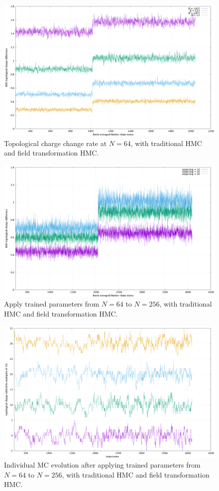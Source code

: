 \begin{figure}
	\centering
	\includegraphics[width=\textwidth]{../topodiffN64.png}
	\caption{\label{topo-diff-n64}Topological charge change rate at $N=64$,
		with traditional HMC and field transformation HMC.}
\end{figure}

\begin{figure}
	\centering
	\includegraphics[width=\textwidth]{../topodiffN256.png}
	\caption{\label{topo-diff-n256}Apply trained parameters from $N=64$ to $N=256$,
		with traditional HMC and field transformation HMC.}
\end{figure}

\begin{figure}
	\centering
	\includegraphics[width=\textwidth]{../topoevoN256.png}
	\caption{\label{topo-evo-n256}Individual MC evolution after
		applying trained parameters from $N=64$ to $N=256$,
		with traditional HMC and field transformation HMC.}
\end{figure}


